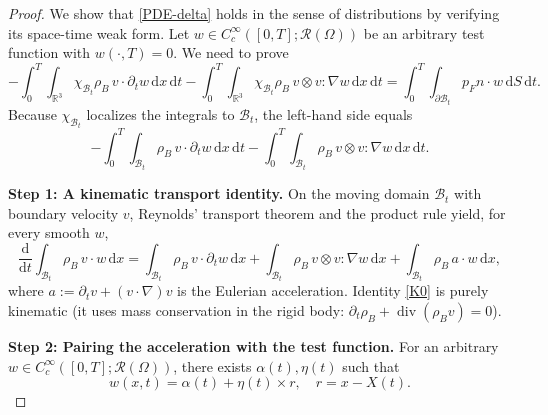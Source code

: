 \documentclass[10pt,a4paper]{amsart}
\begin{document}
\begin{proof}
We show that \eqref{PDE-delta} holds in the sense of distributions by verifying its space-time weak
form. Let $w\in C_c^\infty([0,T];\mathcal{R}(\Omega))$ be an arbitrary test function with
$w(\cdot,T)=0$. We need to prove
\begin{equation}
-\!\!\int_0^T\!\!\int_{\mathbb R^3} \chi_{\mathcal{B}_t}\rho_B\,v\cdot\partial_tw\,\mathrm{d}x\,\mathrm{d}t
-\!\!\int_0^T\!\!\int_{\mathbb R^3} \chi_{\mathcal{B}_t}\rho_B\,v\otimes v:\nabla w\,\mathrm{d}x\,\mathrm{d}t
=\int_0^T\!\!\int_{\partial\mathcal{B}_t} p_Fn\cdot w\,\mathrm{d}S\,\mathrm{d}t.
\label{weak}
\end{equation}
Because $\chi_{\mathcal{B}_t}$ localizes the integrals to $\mathcal B_t$, the left-hand side equals
\begin{equation}
-\!\!\int_0^T\!\!\int_{\mathcal B_t} \rho_B\,v\cdot\partial_t w\,\mathrm{d}x\,\mathrm{d}t
-\!\!\int_0^T\!\!\int_{\mathcal B_t} \rho_B\, v\otimes v:\nabla w\,\mathrm{d}x\,\mathrm{d}t.
\label{LHS}
\end{equation}

\noindent\textbf{Step 1: A kinematic transport identity.}
On the moving domain $\mathcal B_t$ with boundary velocity $v$, Reynolds' transport theorem
and the product rule yield, for every smooth $w$,
\begin{equation}
\frac{\mathrm{d}}{\mathrm{d}t}\int_{\mathcal B_t}\rho_B\,v\cdot w\,\mathrm{d}x
=\int_{\mathcal B_t}\rho_B\, v\cdot\partial_t w\,\mathrm{d}x
+\int_{\mathcal B_t}\rho_B\, v\otimes v:\nabla w\,\mathrm{d}x
+\int_{\mathcal B_t}\rho_B\, a\cdot w\,\mathrm{d}x,
\label{K0}
\end{equation}
where $ a:=\partial_t v+(v\!\cdot\!\nabla) v$ is the Eulerian acceleration.
Identity \eqref{K0} is purely kinematic (it uses mass conservation in the rigid body:
$\partial_t\rho_B+\operatorname{div}(\rho_B v)=0$).

\noindent\textbf{Step 2: Pairing the acceleration with the test function.}
For an arbitrary $w\in C_c^\infty([0,T];\mathcal{R}(\Omega))$, there exists $\alpha(t), \eta(t)$ such that 
\begin{equation}\label{proj}
   w(x,t)=\alpha(t)+\eta(t)\times r,\quad r=x-X(t). 
\end{equation}




\end{proof}
\end{document}

